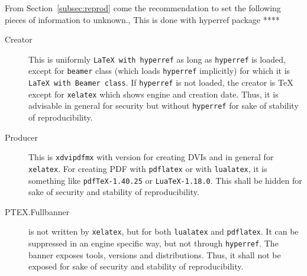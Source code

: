 \documentclass[a4paper, english]{article}%
\newcommand{\pdflatex}{\texttt{pdflatex}}
\newcommand{\lualatex}{\texttt{lualatex}}
\newcommand{\xelatex}{\texttt{xelatex}}
\newcommand{\cmd}[1]{\texttt{\textbackslash#1}}
\begin{document}
From Section~\ref{subsec:reprod} come the recommendation 
to set the following pieces of information to unknown., 
This is done with hyperref package **** 
%
\begin{description}
  \item[Creator] This is uniformly \texttt{LaTeX with hyperref} 
  as long as \texttt{hyperref} is loaded, except for \texttt{beamer} class 
  (which loads \texttt{hyperref} implicitly)
  for which it is \texttt{LaTeX with Beamer class}. 
  If \texttt{hyperref} is not loaded, 
  the creator is \TeX{} except for \xelatex{} which shows engine and creation date. 
  Thus, it is advisable in general for security but without \texttt{hyperref} 
  for sake of stability of reproducibility. 
  \item[Producer] This is \texttt{xdvipdfmx} with version for creating DVIs 
  and in general for \xelatex. 
  For creating PDF with \pdflatex{} or with \lualatex, 
  it is something like \texttt{pdfTeX-1.40.25} or \texttt{LuaTeX-1.18.0}. 
  This shall be hidden for sake of security and stability of reproducibility. 



  
  \item[PTEX.Fullbanner] is not written by \xelatex, 
  but for both \lualatex{} and \pdflatex. 
  It can be suppressed in an engine specific way, 
  but not through \texttt{hyperref}. 
  The banner exposes tools, versions and distributions. 
  Thus, it shall not be exposed for sake of security and stability of reproducibility. 
 

\end{description}
\end{document}
